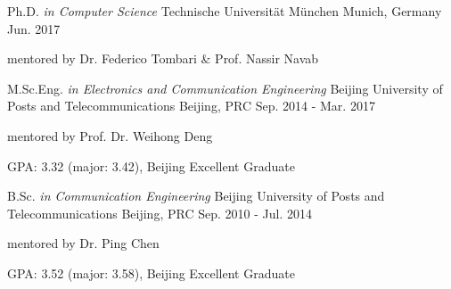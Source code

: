 



\begin{cventries}

\cventry
{Ph.D. \it{in Computer Science}} %
{Technische Universität München} %
{Munich, Germany} %
{Jun. 2017} %
{ %
\begin{cvitems}
\item {mentored by Dr. Federico Tombari \& Prof. Nassir Navab}
\end{cvitems}
}


\cventry
{M.Sc.Eng. \it{in Electronics and Communication Engineering}} %
{Beijing University of Posts and Telecommunications} %
{Beijing, PRC} %
{Sep. 2014 - Mar. 2017} %
{ %
\begin{cvitems}
\item {mentored by Prof. Dr. Weihong Deng}
\item {GPA: 3.32 (major: 3.42), Beijing Excellent Graduate}
\end{cvitems}
}


\cventry
{B.Sc. \it{in Communication Engineering}} %
{Beijing University of Posts and Telecommunications} %
{Beijing, PRC} %
{Sep. 2010 - Jul. 2014} %
{ %
\begin{cvitems}
\item {mentored by Dr. Ping Chen}
\item {GPA: 3.52 (major: 3.58), Beijing Excellent Graduate}
\end{cvitems}
}%

\end{cventries}
